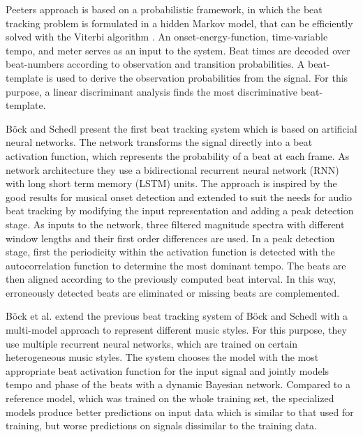 \documentclass{scrartcl}
\begin{document}
Peeters \cite{Peeters2009} approach is based on a probabilistic framework, in which the beat tracking problem is formulated in a hidden Markov model, that can be efficiently solved with the Viterbi algorithm \cite{Viterbi1967}. An onset-energy-function, time-variable tempo, and meter serves as an input to the system. Beat times are decoded over beat-numbers according to observation and transition probabilities. A beat-template is used to derive the observation probabilities from the signal. For this purpose, a linear discriminant analysis finds the most discriminative beat-template. 

Böck and Schedl \cite{Boeck2011} present the first beat tracking system which is based on artificial neural networks. The network transforms the signal directly into a beat activation function, which represents the probability of a beat at each frame.  As network architecture they use a bidirectional recurrent neural network (RNN) with long short term memory (LSTM) units. The approach is inspired by the good results for musical onset detection \cite{Eyben2010} and extended to suit the needs for audio beat tracking by modifying the input representation and adding a peak detection stage. As inputs to the network, three filtered magnitude spectra with different window lengths and their first order differences are used. In a peak detection stage, first the periodicity within the activation function is detected with the autocorrelation function to determine the most dominant tempo. The beats are then aligned according to the previously computed beat interval. In this way, erroneously detected beats are eliminated or missing beats are complemented.

Böck et al. \cite{Boeck2014} extend the previous beat tracking system of Böck and Schedl with a multi-model approach to represent different music styles. For this purpose, they use multiple recurrent neural networks, which are trained on certain heterogeneous music styles. The system chooses the model with the most appropriate beat activation function for the input signal and jointly models tempo and phase of the beats with a dynamic Bayesian network. Compared to a reference model, which was trained on the whole training set, the specialized models produce better predictions on input data which is similar to that used for training, but worse predictions on signals dissimilar to the training data.
\end{document}
